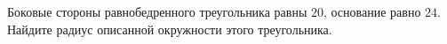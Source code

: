 \begin{ex}
	\begin{condition}
		Боковые стороны равнобедренного треугольника равны \( 20 \), основание равно \( 24 \). Найдите радиус описанной окружности этого треугольника.
	\end{condition}
\end{ex}
